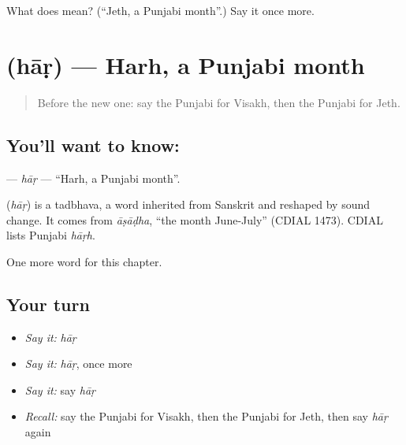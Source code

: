 \begin{tcolorbox}[breakable,colback=teal!4,colframe=teal!35!black,title={Before you move on}]
What does  mean? (\textquotedblleft{}Jeth, a Punjabi month\textquotedblright{}.) Say it once more.
\end{tcolorbox}
\section[\texorpdfstring{\pa{ਹਾੜ} (hāṛ)}{ਹਾੜ (hāṛ)}]{ (hāṛ) — Harh, a Punjabi month}

\label{lesson:PA-C104-har}



\begin{quote}
Before the new one: say the Punjabi for Visakh, then the Punjabi for Jeth.
\end{quote}

\subsection*{You'll want to know: }
\textbf{} — \emph{hāṛ} — \textquotedblleft{}Harh, a Punjabi month\textquotedblright{}.

\begin{cousinweb}
\textbf{} (\emph{hāṛ}) is a tadbhava, a word inherited from Sanskrit and reshaped by sound change. It comes from \emph{āṣāḍha}, \textquotedblleft{}the month June-July\textquotedblright{} (CDIAL 1473). CDIAL lists Punjabi \emph{hāṛh}.
\end{cousinweb}

\begin{grammarlens}[title={What you've built}]
One more word for this chapter.
\end{grammarlens}

\subsection*{Your turn}
\begin{itemize}
\raggedright
  \item \emph{Say it:} \emph{hāṛ}
  \item \emph{Say it:} \emph{hāṛ}, once more
  \item \emph{Say it:} say \emph{hāṛ}
  \item \emph{Recall:} say the Punjabi for Visakh, then the Punjabi for Jeth, then say \emph{hāṛ} again
\end{itemize}

